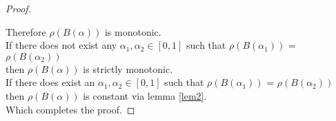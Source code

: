 \begin{proof}
\begin{itemize}[leftmargin=*,labelsep=4mm]
\end{itemize}
Therefore $\rho(B(\alpha))$ is monotonic.\\
If there does not exist any $\alpha_1,\alpha_2\in[0,1]$ such that $\rho(B(\alpha_1))$ = $\rho(B(\alpha_2))$\\
\-\hspace{8mm}then $\rho(B(\alpha))$ is strictly monotonic.\\
If there does exist an $\alpha_1,\alpha_2\in[0,1]$ such that $\rho(B(\alpha_1))$ = $\rho(B(\alpha_2))$\\
\-\hspace{8mm}then $\rho(B(\alpha))$ is constant via lemma \ref{lem2}.\\
Which completes the proof.
\end{proof}

\pagebreak

